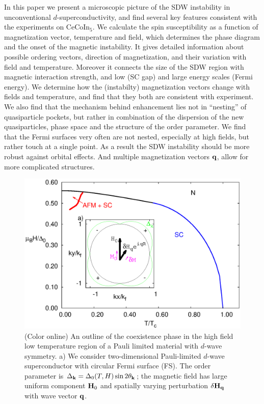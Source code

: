 \documentclass[aps,prl,twocolumn,showpacs,amsmath,amssymb]{revtex4-1}
\newcommand{\cecoin}{CeCoIn$_5$}
\begin{document}
In this paper we present a microscopic picture of the 
SDW instability in unconventional $d$-superconductivity, 
and find several key features 
consistent with the experiments on \cecoin. 
We calculate the spin susceptibility as a function of magnetization vector, 
temperature and field, which determines the phase diagram and the onset of the magnetic instability. 
It gives detailed information about possible ordering vectors, direction of 
magnetization, and their variation with field and temperature. 
Moreover it connects the size of the SDW region with magnetic interaction strength, 
and low (SC gap) and large energy scales (Fermi energy). 
We determine how the (instabilty) magnetization vectors change with fields and temperature, and find that they both 
are consistent with experiment. 
We also find that the mechanism behind enhancement lies not in ``nesting'' of quasiparticle pockets, 
but rather in combination of 
the dispersion of the new quasiparticles, phase space and the structure of the order parameter. 
We find that the Fermi surfaces very often are not nested, especially at high fields, but rather touch at a single 
point. As a result the SDW instability should be more robust against orbital effects. 
And multiple magnetization vectors ${\bf q}$, allow for more complicated structures. 

\begin{figure}[t]
\includegraphics[scale = 0.4]{Fig1.eps}
\caption{ 
	\label{fig:model}
	(Color online)
	An outline of the coexistence phase in the high field low temperature region of a Pauli limited material with $d$-wave symmetry.
	a) We consider two-dimensional Pauli-limited $d$-wave superconductor with circular Fermi surface (FS). 
	The order parameter is $\Delta_{\bf k} = \Delta_0 (T,H) \sin 2\theta_{\bf k} $; 
	the magnetic field has large uniform component ${\bf H}_0$ and spatially varying perturbation $\delta {\bf H}_{\bf q}$
	with wave vector ${\bf q}$. 
}
\end{figure}
\end{document}
